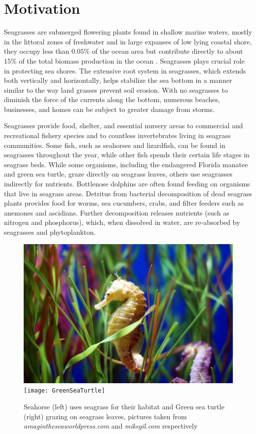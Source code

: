 \documentclass[12pt]{report}   %
\begin{document}
\section{Motivation}
Seagrasses are submerged flowering plants found in shallow marine waters, mostly in the littoral zones of freshwater and in large expanses of low lying coastal shore, they occupy less than $0.05\%$ of the ocean area \cite{green2003world} but contribute directly to about $15\%$ of the total biomass production in the ocean \cite{duarte1999}. Seagrasses plays crucial role in protecting sea shores. The extensive root system in seagrasses, which extends both vertically and horizontally, helps stabilize the sea bottom in a manner similar to the way land grasses prevent soil erosion. With no seagrasses to diminish the force of the currents along the bottom, numerous beaches, businesses, and homes can be subject to greater damage from storms.

Seagrasses provide food, shelter, and essential nursery areas to commercial and recreational fishery species and to countless invertebrates living in seagrass communities.
Some fish, such as seahorses and lizardfish, can be found in seagrasses throughout the year, while other fish spends their certain life stages in seagrass beds. While some organisms, including the endangered Florida manatee and green sea turtle, graze directly on seagrass leaves, others use seagrasses indirectly for nutrients. Bottlenose dolphins are often found feeding on organisms that live in seagrass areas. Detritus from bacterial decomposition of dead seagrass plants provides food for worms, sea cucumbers, crabs, and filter feeders such as anemones and ascidians. Further decomposition releases nutrients (such as nitrogen and phosphorus), which, when dissolved in water, are re-absorbed by seagrasses and phytoplankton.
\begin{figure}
\centerline{ \includegraphics[scale=1.45]{SeaHorse} \texttt{[image: GreenSeaTurtle]} }
\caption{Seahorse (left) uses seagrass for their habitat and Green sea turtle (right) grazing on seagrass leaves, pictures taken from \textit{amagintheseaworldpress.com} and  \textit{mikegil.com} respectively  }
\end{figure}
\end{document}
